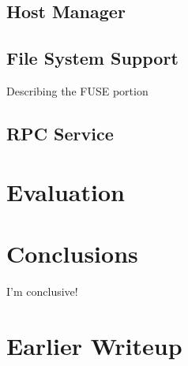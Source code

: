 \documentclass[preprint]{sig-alternate-10pt}
\begin{document}
\subsection{Host Manager}
    

\subsection{File System Support}
Describing the FUSE portion
    

\subsection{RPC Service}


\section{Evaluation}

\section{Conclusions}
I'm conclusive!

\section{Earlier Writeup}




%


%








\end{document}
